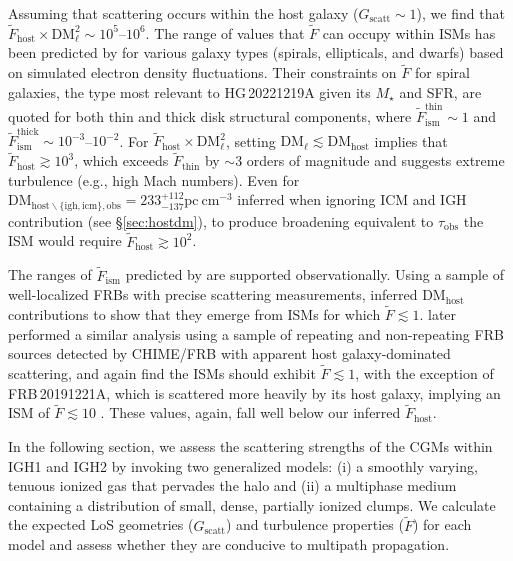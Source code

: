 \documentclass[twocolumn, linenumbers, tra]{aastex631}
\begin{document}
{Assuming that scattering occurs within the host galaxy ($G_{\mathrm{scatt}} \sim 1$), we find that $\widetilde{F}_{\mathrm{host}} \times \mathrm{DM}_{\mathrm{\ell}}^2 \sim 10^{5}$--$10^{6}$. The range of values that $\widetilde{F}$ can occupy within ISMs has been predicted by \citet{Ocker2022b} for various galaxy types (spirals, ellipticals, and dwarfs) based on simulated electron density fluctuations. Their constraints on $\widetilde{F}$ for spiral galaxies, the type most relevant to HG\,20221219A given its $M_{\star}$ and SFR, are quoted for both thin and thick disk structural components, where $\widetilde{F}_{\mathrm{ism}}^{\mathrm{thin}} \sim 1$ and $\widetilde{F}_{\mathrm{ism}}^{\mathrm{thick}} \sim 10^{-3}$--$10^{-2}$. For $\widetilde{F}_{\mathrm{host}} \times \mathrm{DM}_{\mathrm{\ell}}^2$, setting $\mathrm{DM}_{\ell} \lesssim \mathrm{DM}_{\mathrm{host}}$ implies that $\widetilde{F}_{\mathrm{host}} \gtrsim 10^{3}$, which exceeds $\widetilde{F}_{\mathrm{thin}}$ by $ \sim 3$ orders of magnitude and suggests extreme turbulence (e.g., high Mach numbers). Even for $\mathrm{DM}_{\mathrm{host} \backslash\{\mathrm{igh}, \mathrm{icm}\}, \mathrm{obs}} = 233_{-137}^{+112} \mathrm{pc} \mathrm{~cm}^{-3}$ inferred when ignoring ICM and IGH contribution (see \S\ref{sec:hostdm}), to produce broadening equivalent to $\tau_{\mathrm{obs}}$ the ISM would require $\widetilde{F}_{\mathrm{host}} \gtrsim 10^{2}$.
  
The ranges of $\widetilde{F}_{\mathrm{ism}}$ predicted by \citet{Ocker2022b} are supported observationally. Using a sample of well-localized FRBs with precise scattering measurements, \citet{Ocker2021} inferred $\mathrm{DM}_{\mathrm{host}}$ contributions to show that they emerge from ISMs for which $\widetilde{F} \lesssim 1$. \cite{Cordes2022} later performed a similar analysis using a sample of repeating and non-repeating FRB sources detected by CHIME/FRB with apparent host galaxy-dominated scattering, and again find the ISMs should exhibit $\widetilde{F} \lesssim 1$, with the exception of FRB\,20191221A, which is scattered more heavily by its host galaxy, implying an ISM of $\widetilde{F} \lesssim 10$ \citep[see Figure\ 5 in][]{Cordes2022}. These values, again, fall well below our inferred $\widetilde{F}_{\mathrm{host}}$.} 

In the following section, we assess the scattering strengths of the CGMs within IGH1 and IGH2 by invoking two generalized models: (i) a smoothly varying, tenuous ionized gas that pervades the halo and (ii) a multiphase medium containing a distribution of small, dense, partially ionized clumps. We calculate the expected LoS geometries ($G_\mathrm{scatt}$) and turbulence properties ($\widetilde{F}$) for each model and assess whether they are conducive to multipath propagation.
\end{document}
